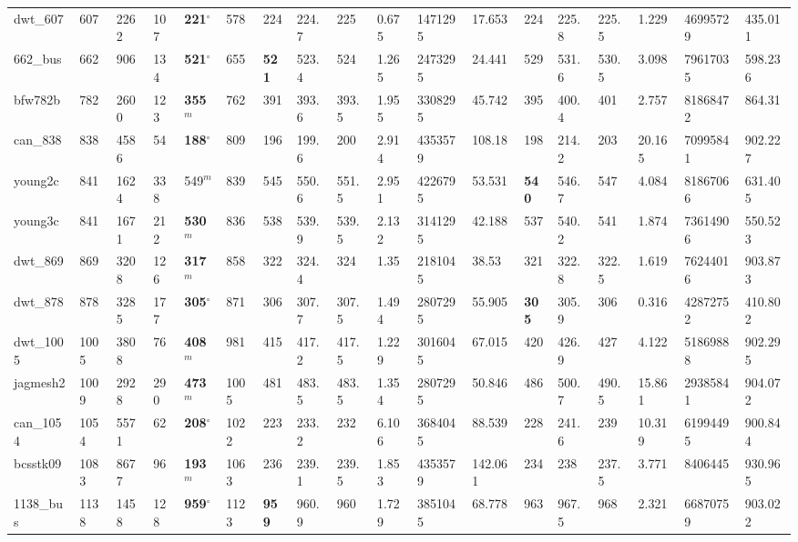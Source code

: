 \begin{table}[h!]
{\begin{tabular}{llllllllllllllllll}
            dwt\_607 & 607 & 2262 & 107 & \textbf{221}$^{\circ}$ & 578 & 224 & 224.7 & 225 & 0.675 & 1471295 & 17.653 & 224 & 225.8 & 225.5 & 1.229 & 46995729 & 435.011 \\
            662\_bus & 662 & 906 & 134 & \textbf{521}$^{\circ}$ & 655 & \textbf{521} & 523.4 & 524 & 1.265 & 2473295 & 24.441 & 529 & 531.6 & 530.5 & 3.098 & 79617035 & 598.236 \\
            bfw782b & 782 & 2600 & 123 & \textbf{355}$^{m}$ & 762 & 391 & 393.6 & 393.5 & 1.955 & 3308295 & 45.742 & 395 & 400.4 & 401 & 2.757 & 81868472 & 864.31 \\
            can\_838 & 838 & 4586 & 54 & \textbf{188}$^{\circ}$ & 809 & 196 & 199.6 & 200 & 2.914 & 4353579 & 108.18 & 198 & 214.2 & 203 & 20.165 & 70995841 & 902.227 \\
            young2c & 841 & 1624 & 338 & 549$^{m}$ & 839 & 545 & 550.6 & 551.5 & 2.951 & 4226795 & 53.531 & \textbf{540} & 546.7 & 547 & 4.084 & 81867066 & 631.405 \\
            young3c & 841 & 1671 & 212 & \textbf{530}$^{m}$ & 836 & 538 & 539.9 & 539.5 & 2.132 & 3141295 & 42.188 & 537 & 540.2 & 541 & 1.874 & 73614906 & 550.523 \\
            dwt\_869 & 869 & 3208 & 126 & \textbf{317}$^{m}$ & 858 & 322 & 324.4 & 324 & 1.35 & 2181045 & 38.53 & 321 & 322.8 & 322.5 & 1.619 & 76244016 & 903.873 \\
            dwt\_878 & 878 & 3285 & 177 & \textbf{305}$^{\circ}$ & 871 & 306 & 307.7 & 307.5 & 1.494 & 2807295 & 55.905 & \textbf{305} & 305.9 & 306 & 0.316 & 42872752 & 410.802 \\
            dwt\_1005 & 1005 & 3808 & 76 & \textbf{408}$^{m}$ & 981 & 415 & 417.2 & 417.5 & 1.229 & 3016045 & 67.015 & 420 & 426.9 & 427 & 4.122 & 51869888 & 902.295 \\
            jagmesh2 & 1009 & 2928 & 290 & \textbf{473}$^{m}$ & 1005 & 481 & 483.5 & 483.5 & 1.354 & 2807295 & 50.846 & 486 & 500.7 & 490.5 & 15.861 & 29385841 & 904.072 \\
            can\_1054 & 1054 & 5571 & 62 & \textbf{208}$^{\circ}$ & 1022 & 223 & 233.2 & 232 & 6.106 & 3684045 & 88.539 & 228 & 241.6 & 239 & 10.319 & 61994495 & 900.844 \\
            bcsstk09 & 1083 & 8677 & 96 & \textbf{193}$^{m}$ & 1063 & 236 & 239.1 & 239.5 & 1.853 & 4353579 & 142.061 & 234 & 238 & 237.5 & 3.771 & 8406445 & 930.965 \\
            1138\_bus & 1138 & 1458 & 128 & \textbf{959}$^{\circ}$ & 1123 & \textbf{959} & 960.9 & 960 & 1.729 & 3851045 & 68.778 & 963 & 967.5 & 968 & 2.321 & 66870759 & 903.022 \\

\end{tabular}}
\end{table}

